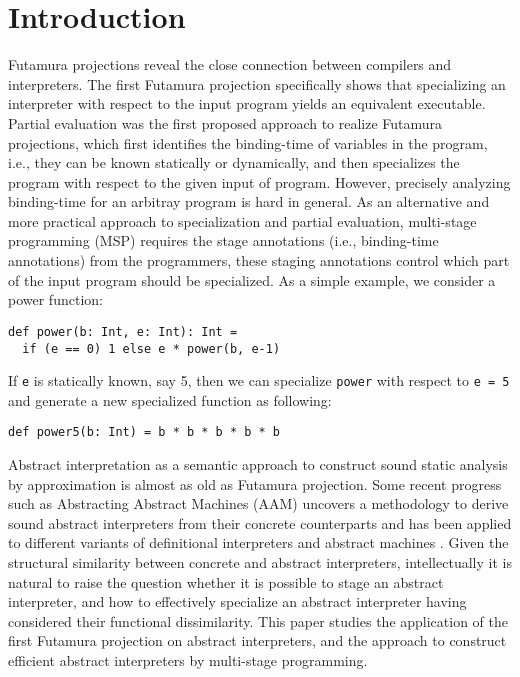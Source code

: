 \section{Introduction}


Futamura projections \cite{Futamura1999, futamura1971partial} reveal the close connection between 
compilers and interpreters. 
The first Futamura projection specifically shows that specializing an interpreter with respect to the input 
program yields an equivalent executable.
Partial evaluation \cite{DBLP:books/daglib/0072559} was the first proposed approach to realize Futamura projections,
which first identifies the binding-time of variables in the program, i.e., they can be known statically or dynamically, 
and then specializes the program with respect to the given input of program.
However, precisely analyzing binding-time for an arbitray program is hard in general. As an alternative and more practical 
approach to specialization and partial evaluation, multi-stage programming (MSP) \cite{taha1999multi, DBLP:conf/pepm/TahaS97} 
requires the stage annotations (i.e., binding-time annotations) from the programmers, these staging annotations 
control which part of the input program should be specialized.
As a simple example, we consider a power function: 
\begin{lstlisting}
def power(b: Int, e: Int): Int = 
  if (e == 0) 1 else e * power(b, e-1)
\end{lstlisting}
If \texttt{e} is statically known, say 5, then we can specialize \texttt{power} with respect to \texttt{e = 5} and 
generate a new specialized function as following:
\begin{lstlisting}
def power5(b: Int) = b * b * b * b * b
\end{lstlisting}

Abstract interpretation \cite{DBLP:conf/popl/CousotC77} as a semantic approach to construct sound static analysis 
by approximation is almost as old as Futamura projection.
Some recent progress such as Abstracting Abstract Machines (AAM) uncovers a methodology to derive sound abstract interpreters 
from their concrete counterparts and has been applied to different variants of definitional interpreters and abstract machines
\cite{DBLP:journals/jfp/HornM12, DBLP:conf/icfp/HornM10, DBLP:journals/pacmpl/DaraisLNH17}.
Given the structural similarity between concrete and abstract interpreters, intellectually 
it is natural to raise the question whether it is possible to stage an abstract interpreter, and how 
to effectively specialize an abstract interpreter having considered their functional dissimilarity. 
This paper studies the application of the first Futamura projection on abstract interpreters, 
and the approach to construct efficient abstract interpreters by multi-stage programming.


